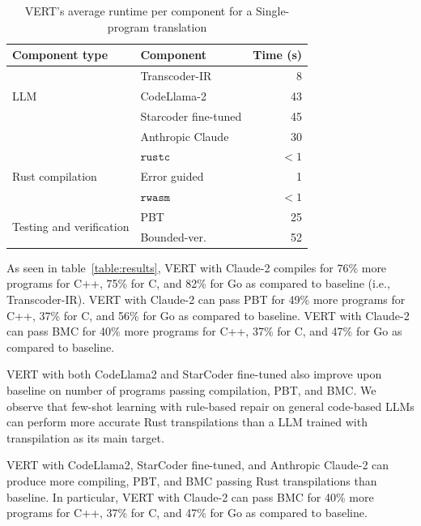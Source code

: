 \documentclass[12pt,openany,oneside,table]{cmuthesis}
\begin{document}
\begin{table}[t!]
\centering
\caption{\small VERT's average runtime per component for a Single-program translation}
\begin{tabular}{llr}
\toprule
\textbf{Component type} & \textbf{Component} & \textbf{Time (s)}\\
\midrule\multirow{3}{*}{LLM}
& Transcoder-IR & 8 \\
& CodeLlama-2 & 43 \\
& Starcoder fine-tuned & 45 \\
& Anthropic Claude & 30 \\

\midrule\multirow{3}{*}{Rust compilation}
& $\texttt{rustc}$ & $<1$ \\
& Error guided  & 1 \\
& $\texttt{rwasm}$ & $<1$ \\

\midrule\multirow{3}{*}{Testing and verification}
& PBT & 25 \\
& Bounded-ver. & 52 \\

\bottomrule
\end{tabular}
\label{table:time}
\end{table}

As seen in table~\ref{table:results}, VERT with Claude-2 compiles for 76\% more programs for C++, 75\% for C, and 82\% for Go as compared to baseline (i.e., Transcoder-IR).
VERT with Claude-2 can pass PBT for 49\% more programs for C++, 37\% for C, and 56\% for Go as compared to baseline.
VERT with Claude-2 can pass BMC for 40\% more programs for C++, 37\% for C, and 47\% for Go as compared to baseline.

VERT with both CodeLlama2 and StarCoder fine-tuned also improve upon baseline on number of programs passing compilation, PBT, and BMC. We observe that few-shot learning with rule-based repair on general code-based LLMs can perform more accurate Rust transpilations than a LLM trained with transpilation as its main target.

\begin{tcolorbox}
[colback=white,colframe=black,arc=0pt,boxrule=0.5pt,title=RQ1 Summary,boxsep=2pt,left=1pt,right=1pt,top=1pt,bottom=1pt,fonttitle=\bfseries]
VERT with CodeLlama2, StarCoder fine-tuned, and Anthropic Claude-2 can produce more compiling, PBT, and BMC passing Rust transpilations than baseline. In particular, VERT with Claude-2 can pass BMC for 40\% more programs for C++, 37\% for C, and 47\% for Go as compared to baseline.
\end{tcolorbox}
\end{document}
